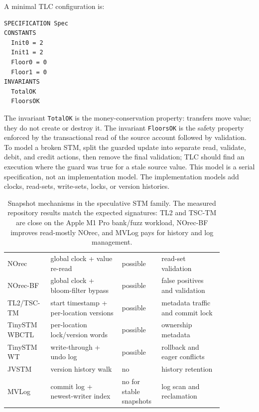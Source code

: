 A minimal TLC configuration is:

\begin{lstlisting}[language={}, caption={TLC configuration for the PlusCal account-floor model.}]
SPECIFICATION Spec
CONSTANTS
  Init0 = 2
  Init1 = 2
  Floor0 = 0
  Floor1 = 0
INVARIANTS
  TotalOK
  FloorsOK
\end{lstlisting}

The invariant \texttt{TotalOK} is the money-conservation property: transfers move value; they do not create or destroy it. The invariant \texttt{FloorsOK} is the safety property enforced by the transactional read of the source account followed by validation. To model a broken STM, split the guarded update into separate read, validate, debit, and credit actions, then remove the final validation; TLC should find an execution where the guard was true for a stale source value. This model is a serial specification, not an implementation model. The implementation models add clocks, read-sets, write-sets, locks, or version histories.

\begin{table}[htbp]
\centering
\small
\begin{tabular}{M{0.16\linewidth}M{0.30\linewidth}M{0.14\linewidth}M{0.26\linewidth}}
\hline
{} &  &  &  \\
\hline
NOrec & global clock + value re-read & possible & read-set validation \\
NOrec-BF & global clock + bloom-filter bypass & possible & false positives and validation \\
TL2/TSC-TM & start timestamp + per-location versions & possible & metadata traffic and commit lock \\
TinySTM WBCTL & per-location lock/version words & possible & ownership metadata \\
TinySTM WT & write-through + undo log & possible & rollback and eager conflicts \\
JVSTM & version history walk & no & history retention \\
MVLog & commit log + newest-writer index & no for stable snapshots & log scan and reclamation \\
\hline
\end{tabular}
\caption{Snapshot mechanisms in the speculative STM family.  The measured repository results match the expected signatures: TL2 and TSC-TM are close on the Apple M1 Pro bank/fuzz workload, NOrec-BF improves read-mostly NOrec, and MVLog pays for history and log management.}
\label{tab:snapshot-taxonomy}
\end{table}

